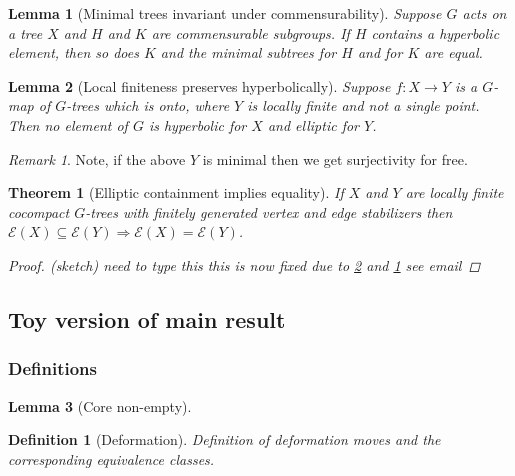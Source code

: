 \documentclass{article}
\theoremstyle{mystyle}
\newtheorem{thm}{Theorem}[section]
\newtheorem{lem}{Lemma}[section]
\newtheorem{defn}{Definition}[section]
\theoremstyle{remark}
\newtheorem{rmk}{Remark}[section]
\begin{document}
\begin{lem}
    [Minimal trees invariant under commensurability]
    \label{lem:commensurableminimal} 
    Suppose \(G\) acts on a tree \(X\) and \(H\) and \(K\) are commensurable subgroups. If \(H\) contains a hyperbolic element, then so does \(K\) and the minimal subtrees for \(H\) and for \(K\) are equal.
\end{lem}

\begin{lem}
    [Local finiteness preserves hyperbolically]
    \label{lem:localfinhyper} 
    Suppose \(f:X \to Y\) is a \(G\)-map of \(G\)-trees which is onto, where \(Y\) is locally finite and not a single point. Then no element of \(G\) is hyperbolic for \(X\) and elliptic for \(Y\).
\end{lem}

\begin{rmk}
    Note, if the above \(Y\) is minimal then we get surjectivity for free.
\end{rmk}

\begin{thm}
    [Elliptic containment implies equality]
    \label{thm:ellipticimpliesequality} 
    If \(X\) and \(Y\) are locally finite cocompact \(G\)-trees with finitely generated vertex and edge stabilizers then \(\mathcal{E}(X) \subseteq \mathcal{E}(Y) \Longrightarrow \mathcal{E}(X) = \mathcal{E}(Y) \). 
    \begin{proof}
    
        (sketch) need to type this
        this is now fixed due to \ref{lem:localfinhyper} and \ref{lem:commensurableminimal} see email
    \end{proof}
\end{thm}






\subsection{Toy version of main result}


\subsubsection{Definitions}

\begin{lem}
    [Core non-empty]
    \label{lem:nonempty} 
\end{lem}

\begin{defn}
    [Deformation]
    \label{defn:deformation} 
    Definition of deformation moves and the corresponding equivalence classes.
\end{defn}
\end{document}
